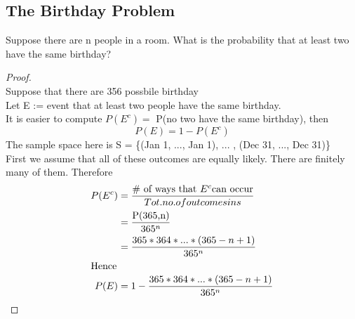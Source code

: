 \documentclass[11pt]{article}
\newcommand\tab[1][1cm]{\hspace*{#1}}
\begin{document}
        \subsection{The Birthday Problem}
            Suppose there are n people in a room. What is the probability that at least two have the same birthday?
            \begin{proof}\tab
                \\Suppose that there are 356 possbile birthday
                \\Let E := event that at least two people have the same birthday.
                \\It is easier to compute $P(E^c)= $ P(no two have the same birthday), then 
                \[P(E) = 1-P(E^c) \tag{by Thm 1}\]
                The sample space here is S = \{(Jan 1, ..., Jan 1), ... , (Dec 31, ..., Dec 31)\}
                \\First we assume that all of these outcomes are equally likely. There are finitely many of them.
                Therefore 
                \begin{align*}
                    P(E^c)  &= \frac{\text{\# of ways that } E^c \text{can occur}}{Tot. no. of outcomes in s}\\
                            &= \frac{\text{P(365,n)}}{365^n}\\
                            &= \frac{365*364*...*(365-n+1)}{365^n }\\
                    \intertext{Hence}
                    P(E)    &= 1 - \frac{365*364*...*(365-n+1)}{365^n }
                \end{align*}
            \end{proof}
        
\end{document}
